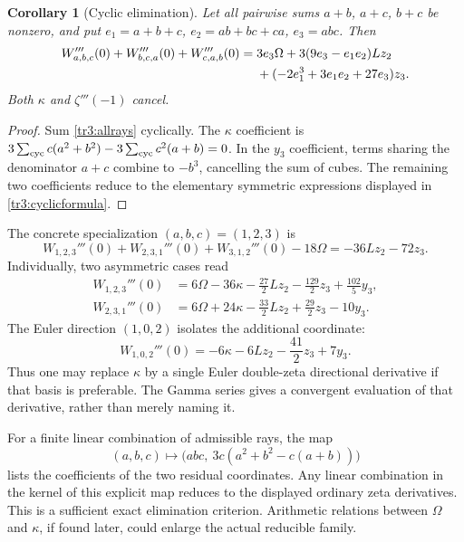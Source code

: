 \documentclass[11pt]{article}
\numberwithin{equation}{section}
\theoremstyle{plain}
\newtheorem{corollary}[theorem]{Corollary}
\theoremstyle{definition}
\theoremstyle{remark}
\begin{document}
\begin{corollary}[Cyclic elimination]\label{tr3:cyclic}
Let all pairwise sums $a+b$, $a+c$, $b+c$ be nonzero, and put
$e_1=a+b+c$, $e_2=ab+bc+ca$, $e_3=abc$.  Then
\begin{align}\label{tr3:cyclicformula}
 W_{a,b,c}'''(0)+W_{b,c,a}'''(0)+W_{c,a,b}'''(0)
 ={}&3e_3\Omega+3(9e_3-e_1e_2)Lz_2\notag\\
 &+(-2e_1^3+3e_1e_2+27e_3)z_3.
\end{align}
Both $\kappa$ and $\zeta'''(-1)$ cancel.
\end{corollary}

\begin{proof}
Sum \eqref{tr3:allrays} cyclically.  The $\kappa$ coefficient is
$3\sum_{\rm cyc}c(a^2+b^2)-3\sum_{\rm cyc}c^2(a+b)=0$.
In the $y_3$ coefficient, terms sharing the denominator $a+c$ combine
to $-b^3$, cancelling the sum of cubes.  The remaining two
coefficients reduce to the elementary symmetric expressions displayed
in \eqref{tr3:cyclicformula}.
\end{proof}

The concrete specialization $(a,b,c)=(1,2,3)$ is
\[
 W_{1,2,3}'''(0)+W_{2,3,1}'''(0)+W_{3,1,2}'''(0)-18\Omega
       =-36Lz_2-72z_3.
\]
Individually, two asymmetric cases read
\begin{align*}
 W_{1,2,3}'''(0)&=6\Omega-36\kappa
                -\frac{27}{2}Lz_2-\frac{129}{2}z_3+\frac{102}{5}y_3,\\
 W_{2,3,1}'''(0)&=6\Omega+24\kappa
                -\frac{33}{2}Lz_2+\frac{29}{2}z_3-10y_3.
\end{align*}
The Euler direction $(1,0,2)$ isolates the additional coordinate:
\begin{equation}\label{tr3:kappaisolate}
 W_{1,0,2}'''(0)=-6\kappa-6Lz_2-\frac{41}{2}z_3+7y_3.
\end{equation}
Thus one may replace $\kappa$ by a single Euler double-zeta directional
derivative if that basis is preferable.  The Gamma series gives a
convergent evaluation of that derivative, rather than merely naming it.

For a finite linear combination of admissible rays, the map
\[
 (a,b,c)\longmapsto
 \bigl(abc,\ 3c(a^2+b^2-c(a+b))\bigr)
\]
lists the coefficients of the two residual coordinates.  Any linear
combination in the kernel of this explicit map reduces to the displayed
ordinary zeta derivatives.  This is a sufficient exact elimination
criterion.  Arithmetic relations between $\Omega$ and $\kappa$, if
found later, could enlarge the actual reducible family.
\end{document}
